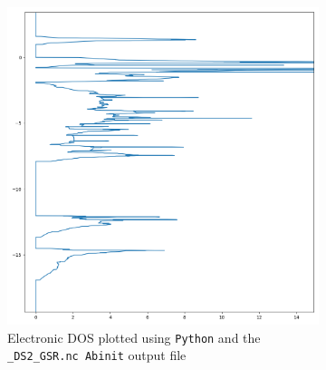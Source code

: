 \documentclass[11pt,a4paper]{article}
\begin{document}
\begin{figure}[H]
\centering
\begin{subfigure}[b]{0.57\textwidth}
\centering
\includegraphics[width=\textwidth]{images/dos2}
\caption{Electronic DOS plotted using \texttt{Python} and the \texttt{\_DS2\_GSR.nc Abinit} output file\\\hspace{1cm}\\}
\label{fig:dos2}
\end{subfigure}
\hfill
\begin{subfigure}[b]{0.33\textwidth}
\centering

\end{subfigure}
\end{figure}
\end{document}
